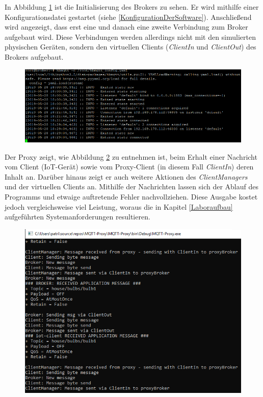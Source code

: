     In Abbildung \ref{fig:broker_connections} ist die Initialisierung des Brokers zu sehen. Er wird mithilfe einer Konfigurationsdatei gestartet (siehe \ref{KonfigurationDerSoftware}). Anschließend wird angezeigt, dass erst eine und danach eine zweite Verbindung zum Broker aufgebaut wird. Diese Verbindungen werden allerdings nicht mit den simulierten physischen Geräten, sondern den virtuellen Clients (\emph{ClientIn} und \emph{ClientOut}) des Brokers aufgebaut.
    \begin{figure}[!h]%
        \centering
        \includegraphics[width=14cm]{tex/bilder/6_validierung/BrokerConnections.png}
        \label{fig:broker_connections}
    \end{figure}
    
    Der Proxy zeigt, wie Abbildung \ref{fig:proxy_messages} zu entnehmen ist, beim Erhalt einer Nachricht vom Client (\ac{IoT}-Gerät) sowie vom Proxy-Client (in diesem Fall \emph{ClientIn}) deren Inhalt an.
    Darüber hinaus zeigt er auch weitere Aktionen des \emph{ClientManagers} und der virtuellen Clients an.
    Mithilfe der Nachrichten lassen sich der Ablauf des Programms und etwaige auftretende Fehler nachvollziehen. Diese Ausgabe kostet jedoch vergleichsweise viel Leistung, woraus die in Kapitel \ref{Laboraufbau} aufgeführten Systemanforderungen resultieren. 
    \begin{figure}[!h]%
        \centering
        \includegraphics[width=12cm]{tex/bilder/6_validierung/ProxyMessages.png}
        \label{fig:proxy_messages}
    \end{figure}
    
